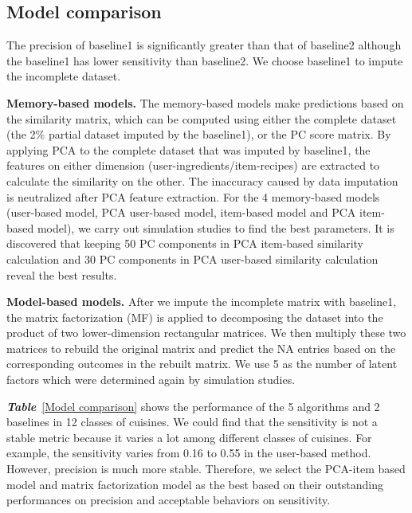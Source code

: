 \documentclass{article}
\begin{document}
\subsection{Model comparison}
The precision of baseline1 is significantly greater than that of baseline2 although the baseline1 has lower sensitivity than baseline2. We choose baseline1 to impute the incomplete dataset.

\textbf{Memory-based models.}
The memory-based models make predictions based on the similarity matrix, which can be computed using either the complete dataset (the 2\% partial dataset imputed by the baseline1), or the PC score matrix. By applying PCA to the complete dataset that was imputed by baseline1, the features on either dimension (user-ingredients/item-recipes) are extracted to calculate the similarity on the other. The inaccuracy caused by data imputation is neutralized after PCA feature extraction. For the 4 memory-based models (user-based model, PCA user-based model, item-based model and PCA item-based model), we carry out simulation studies to find the best parameters. It is discovered that keeping 50 PC components in PCA item-based similarity calculation and 30 PC components in PCA user-based similarity calculation reveal the best results.

\textbf{Model-based models.}
After we impute the incomplete matrix with baseline1, the matrix factorization (MF) is applied to decomposing the dataset into the product of two lower-dimension rectangular matrices. We then multiply these two matrices to rebuild the original matrix and predict the NA entries based on the corresponding outcomes in the rebuilt matrix. We use 5 as the number of latent factors which were determined again by simulation studies.

\emph{\textbf{Table}}~\ref{Model comparison} shows the performance of the 5 algorithms and 2 baselines in 12 classes of cuisines. We could find that the sensitivity is not a stable metric because it varies a lot among different classes of cuisines. For example, the sensitivity varies from 0.16 to 0.55 in the user-based method. However, precision is much more stable. Therefore, we select the PCA-item based model and matrix factorization model as the best based on their outstanding performances on precision and acceptable behaviors on sensitivity. 
\end{document}
